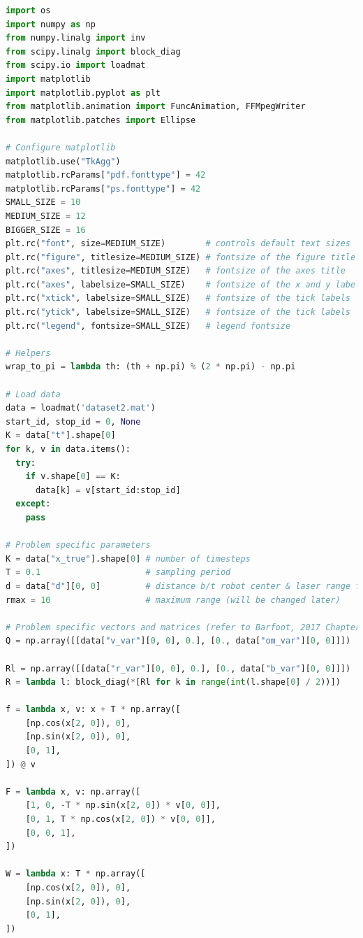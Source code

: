\documentclass[a4paper]{article}
\begin{document}
\begin{lstlisting}[language=Python, basicstyle=\small]
import os
import numpy as np
from numpy.linalg import inv
from scipy.linalg import block_diag
from scipy.io import loadmat
import matplotlib
import matplotlib.pyplot as plt
from matplotlib.animation import FuncAnimation, FFMpegWriter
from matplotlib.patches import Ellipse

# Configure matplotlib
matplotlib.use("TkAgg")
matplotlib.rcParams["pdf.fonttype"] = 42
matplotlib.rcParams["ps.fonttype"] = 42
SMALL_SIZE = 10
MEDIUM_SIZE = 12
BIGGER_SIZE = 16
plt.rc("font", size=MEDIUM_SIZE)        # controls default text sizes
plt.rc("figure", titlesize=MEDIUM_SIZE) # fontsize of the figure title
plt.rc("axes", titlesize=MEDIUM_SIZE)   # fontsize of the axes title
plt.rc("axes", labelsize=SMALL_SIZE)    # fontsize of the x and y labels
plt.rc("xtick", labelsize=SMALL_SIZE)   # fontsize of the tick labels
plt.rc("ytick", labelsize=SMALL_SIZE)   # fontsize of the tick labels
plt.rc("legend", fontsize=SMALL_SIZE)   # legend fontsize

# Helpers
wrap_to_pi = lambda th: (th + np.pi) % (2 * np.pi) - np.pi

# Load data
data = loadmat('dataset2.mat')
start_id, stop_id = 0, None
K = data["t"].shape[0]
for k, v in data.items():
  try:
    if v.shape[0] == K:
      data[k] = v[start_id:stop_id]
  except:
    pass

# Problem specific parameters
K = data["x_true"].shape[0] # number of timesteps
T = 0.1                     # sampling period
d = data["d"][0, 0]         # distance b/t robot center & laser range finder
rmax = 10                   # maximum range (will be changed later)

# Problem specific vectors and matrices (refer to Barfoot, 2017 Chapter 4.2.3)
Q = np.array([[data["v_var"][0, 0], 0.], [0., data["om_var"][0, 0]]])

Rl = np.array([[data["r_var"][0, 0], 0.], [0., data["b_var"][0, 0]]])
R = lambda l: block_diag(*[Rl for k in range(int(l.shape[0] / 2))])

f = lambda x, v: x + T * np.array([
    [np.cos(x[2, 0]), 0],
    [np.sin(x[2, 0]), 0],
    [0, 1],
]) @ v

F = lambda x, v: np.array([
    [1, 0, -T * np.sin(x[2, 0]) * v[0, 0]],
    [0, 1, T * np.cos(x[2, 0]) * v[0, 0]],
    [0, 0, 1],
])

W = lambda x: T * np.array([
    [np.cos(x[2, 0]), 0],
    [np.sin(x[2, 0]), 0],
    [0, 1],
])


\end{lstlisting}
\end{document}

